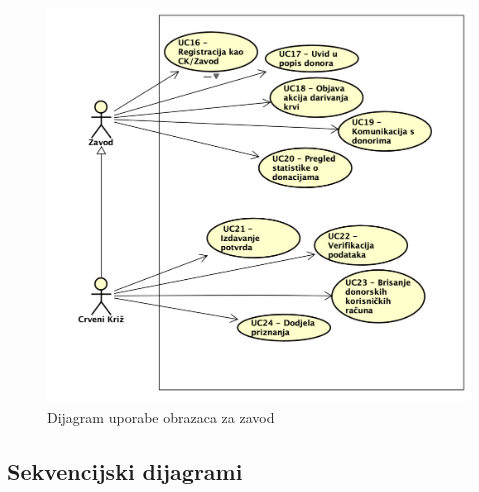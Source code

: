 					\begin{figure}[H]
						\includegraphics[scale=0.4]{slike/Dijagrami/DOU_zavod.PNG} %
						\centering
						\caption{Dijagram uporabe obrazaca za zavod}
						\label{fig:promjene}
					\end{figure}
				\eject		
				
			\subsection{Sekvencijski dijagrami}
				
